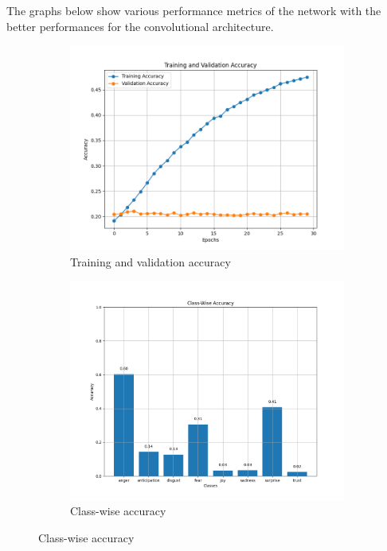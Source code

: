 The graphs below show various performance metrics of the network with the better
performances for the convolutional architecture.
\begin{figure}[H]
    \centering
    \begin{subfigure}{0.48\textwidth}
        \includegraphics[width=\textwidth]{pictures/cnn_accuracy.png}
        \caption{Training and validation accuracy}
        \label{fig:cnn_train_val_acc}
    \end{subfigure}
    \begin{subfigure}{0.5\textwidth}
        \includegraphics[width=\textwidth]{pictures/cnn_class_accuracy.png}
        \caption{Class-wise accuracy}

\end{subfigure}
\end{figure}
